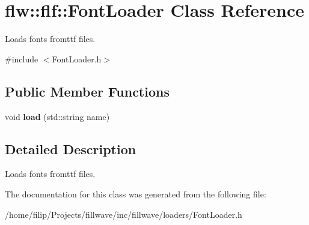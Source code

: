 \hypertarget{classflw_1_1flf_1_1FontLoader}{}\section{flw\+:\+:flf\+:\+:Font\+Loader Class Reference}
\label{classflw_1_1flf_1_1FontLoader}


Loads fonts fromttf files.  




{\ttfamily \#include $<$Font\+Loader.\+h$>$}

\subsection*{Public Member Functions}
\begin{DoxyCompactItemize}
\item 
void {\bfseries load} (std\+::string name)\hypertarget{classflw_1_1flf_1_1FontLoader_ab749fb5cf17cc2ee89072fe1295e72ba}{}\label{classflw_1_1flf_1_1FontLoader_ab749fb5cf17cc2ee89072fe1295e72ba}

\end{DoxyCompactItemize}


\subsection{Detailed Description}
Loads fonts fromttf files. 

The documentation for this class was generated from the following file\+:\begin{DoxyCompactItemize}
\item 
/home/filip/\+Projects/fillwave/inc/fillwave/loaders/Font\+Loader.\+h\end{DoxyCompactItemize}
